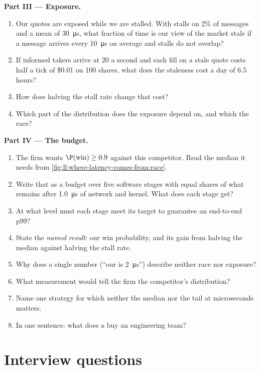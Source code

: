 \begin{problem}
\medskip\noindent\textbf{Part III --- Exposure.}
\begin{enumerate}[resume]
\item Our quotes are exposed while we are stalled. With stalls on 2\% of messages and a mean of
\qty{30}{\micro\second}, what fraction of time is our view of the market stale if a message arrives every
\qty{10}{\micro\second} on average and stalls do not overlap?
\item If informed takers arrive at 20 a second and each fill on a stale quote costs half a tick of \$0.01 on 100
shares, what does the staleness cost a day of 6.5 hours?
\item How does halving the stall rate change that cost?
\item Which part of the distribution does the exposure depend on, and which the race?
\end{enumerate}

\medskip\noindent\textbf{Part IV --- The budget.}
\begin{enumerate}[resume]
\item The firm wants $\P(\text{win}) \ge 0.9$ against this competitor. Read the median it needs from
\cref{fig:ll:where-latency-comes-from:race}.
\item Write that as a budget over five software stages with equal shares of what remains after
\qty{1.0}{\micro\second} of network and kernel. What does each stage get?
\item At what level must each stage meet its target to guarantee an end-to-end p99?
\item State the \emph{named result}: our win probability, and its gain from halving the median against halving the
stall rate.
\item Why does a single number (``our  is \qty{2}{\micro\second}'') describe neither race nor exposure?
\item What measurement would tell the firm the competitor's distribution?
\item Name one strategy for which neither the median nor the tail at microseconds matters.
\item In one sentence: what does a  buy an engineering team?
\end{enumerate}
\end{problem}

\section{Interview questions}

